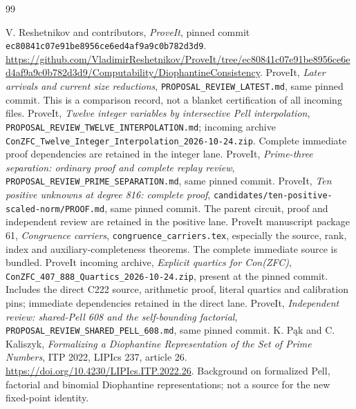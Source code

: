 \documentclass[11pt,letterpaper]{article}
\theoremstyle{definition}\newtheorem{definition}[theorem]{Definition}
\theoremstyle{remark}\newtheorem{remark}[theorem]{Remark}
\begin{document}
\begin{thebibliography}{99}
\raggedright
{} V. Reshetnikov and contributors, \emph{ProveIt}, pinned commit \texttt{ec80841c07e91be8956ce6ed4af9a9c0b782d3d9}. \url{https://github.com/VladimirReshetnikov/ProveIt/tree/ec80841c07e91be8956ce6ed4af9a9c0b782d3d9/Computability/DiophantineConsistency}.
 ProveIt, \emph{Later arrivals and current size reductions}, \texttt{PROPOSAL\_REVIEW\_LATEST.md}, same pinned commit. This is a comparison record, not a blanket certification of all incoming files.
 ProveIt, \emph{Twelve integer variables by intersective Pell interpolation}, \texttt{PROPOSAL\_REVIEW\_TWELVE\_INTERPOLATION.md}; incoming archive \texttt{ConZFC\_Twelve\_Integer\_Interpolation\_2026-10-24.zip}. Complete immediate proof dependencies are retained in the integer lane.
 ProveIt, \emph{Prime-three separation: ordinary proof and complete replay review}, \texttt{PROPOSAL\_REVIEW\_PRIME\_SEPARATION.md}, same pinned commit.
 ProveIt, \emph{Ten positive unknowns at degree 816: complete proof}, \texttt{candidates/ten-positive-scaled-norm/PROOF.md}, same pinned commit. The parent circuit, proof and independent review are retained in the positive lane.
 ProveIt manuscript package 61, \emph{Congruence carriers}, \texttt{congruence\_carriers.tex}, especially the source, rank, index and auxiliary-completeness theorems. The complete immediate source is bundled.
 ProveIt incoming archive, \emph{Explicit quartics for Con(ZFC)}, \texttt{ConZFC\_407\_888\_Quartics\_2026-10-24.zip}, present at the pinned commit. Includes the direct C222 source, arithmetic proof, literal quartics and calibration pins; immediate dependencies retained in the direct lane.
 ProveIt, \emph{Independent review: shared-Pell 608 and the self-bounding factorial}, \texttt{PROPOSAL\_REVIEW\_SHARED\_PELL\_608.md}, same pinned commit.
 K. P\k{a}k and C. Kaliszyk, \emph{Formalizing a Diophantine Representation of the Set of Prime Numbers}, ITP 2022, LIPIcs 237, article 26. \url{https://doi.org/10.4230/LIPIcs.ITP.2022.26}. Background on formalized Pell, factorial and binomial Diophantine representations; not a source for the new fixed-point identity.
\end{thebibliography}
\end{document}

